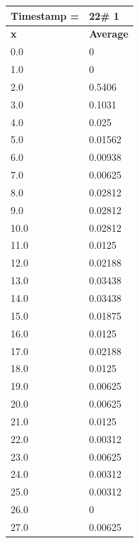 \begin{tabular}{|l||l|}
\hline
\textbf{Timestamp =} & \textbf{22}\# 1\\\hline
	\textbf{x} & \textbf{Average} \\ \hline
\hline
	0.0 & 0 \\ \hline
	1.0 & 0 \\ \hline
	2.0 & 0.5406 \\ \hline
	3.0 & 0.1031 \\ \hline
	4.0 & 0.025 \\ \hline
	5.0 & 0.01562 \\ \hline
	6.0 & 0.00938 \\ \hline
	7.0 & 0.00625 \\ \hline
	8.0 & 0.02812 \\ \hline
	9.0 & 0.02812 \\ \hline
	10.0 & 0.02812 \\ \hline
	11.0 & 0.0125 \\ \hline
	12.0 & 0.02188 \\ \hline
	13.0 & 0.03438 \\ \hline
	14.0 & 0.03438 \\ \hline
	15.0 & 0.01875 \\ \hline
	16.0 & 0.0125 \\ \hline
	17.0 & 0.02188 \\ \hline
	18.0 & 0.0125 \\ \hline
	19.0 & 0.00625 \\ \hline
	20.0 & 0.00625 \\ \hline
	21.0 & 0.0125 \\ \hline
	22.0 & 0.00312 \\ \hline
	23.0 & 0.00625 \\ \hline
	24.0 & 0.00312 \\ \hline
	25.0 & 0.00312 \\ \hline
	26.0 & 0 \\ \hline
	27.0 & 0.00625 \\ \hline
\end{tabular}
